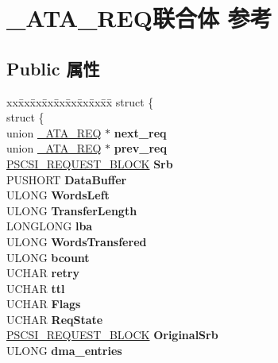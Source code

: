 \hypertarget{union___a_t_a___r_e_q}{}\section{\+\_\+\+A\+T\+A\+\_\+\+R\+E\+Q联合体 参考}
\label{union___a_t_a___r_e_q}
\subsection*{Public 属性}
\begin{DoxyCompactItemize}
\item 
\mbox{\label{union___a_t_a___r_e_q_abd38d496b9cf59a787294d7ac35283bd}} 
\begin{tabbing}
xx\=xx\=xx\=xx\=xx\=xx\=xx\=xx\=xx\=\kill
struct \{\\
\mbox{\label{struct___a_t_a___r_e_q_1_1_0D1058_a32aa502908e74b48da0f4e536fcc6c0c}} 
\>struct \{\\
\>\>union \hyperlink{union___a_t_a___r_e_q}{\_ATA\_REQ} $\ast$ {\bfseries next\_req}\\
\>\>union \hyperlink{union___a_t_a___r_e_q}{\_ATA\_REQ} $\ast$ {\bfseries prev\_req}\\
\>\>\hyperlink{struct___s_c_s_i___r_e_q_u_e_s_t___b_l_o_c_k}{PSCSI\_REQUEST\_BLOCK} {\bfseries Srb}\\
\>\>PUSHORT {\bfseries DataBuffer}\\
\>\>ULONG {\bfseries WordsLeft}\\
\>\>ULONG {\bfseries TransferLength}\\
\>\>LONGLONG {\bfseries lba}\\
\>\>ULONG {\bfseries WordsTransfered}\\
\>\>ULONG {\bfseries bcount}\\
\>\>UCHAR {\bfseries retry}\\
\>\>UCHAR {\bfseries ttl}\\
\>\>UCHAR {\bfseries Flags}\\
\>\>UCHAR {\bfseries ReqState}\\
\>\>\hyperlink{struct___s_c_s_i___r_e_q_u_e_s_t___b_l_o_c_k}{PSCSI\_REQUEST\_BLOCK} {\bfseries OriginalSrb}\\
\>\>ULONG {\bfseries dma\_entries}\\
\mbox{\label{struct___a_t_a___r_e_q_1_1_0D1058_1_1_0D1060_adde41df7733897a675b61341f3651132}} 

\end{tabbing}
\end{DoxyCompactItemize}
